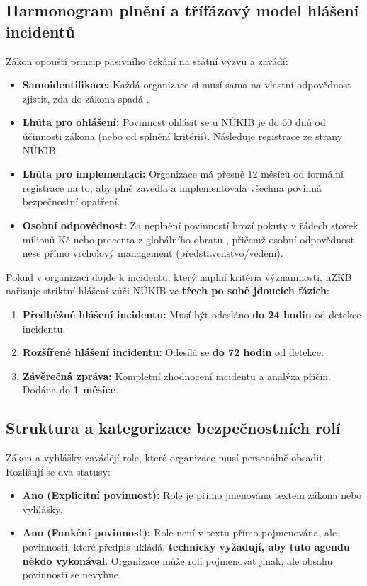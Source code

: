\documentclass[10pt,a4paper]{article}
\begin{document}
	\subsection{Harmonogram plnění a třífázový model hlášení incidentů}
	Zákon opouští princip pasivního čekání na státní výzvu a zavádí:
	\begin{itemize}
		\item \textbf{Samoidentifikace:} Každá organizace si musí sama na vlastní odpovědnost zjistit, zda do zákona spadá .  
		
		\item \textbf{Lhůta pro ohlášení:} Povinnost ohlásit se u NÚKIB je do 60 dnů od účinnosti zákona (nebo od splnění kritérií). Následuje registrace ze strany NÚKIB.  
		
		\item \textbf{Lhůta pro implementaci:} Organizace má přesně 12 měsíců od formální registrace na to, aby plně zavedla a implementovala všechna povinná bezpečnostní opatření.  
		
		\item \textbf{Osobní odpovědnost:} Za neplnění povinností hrozí pokuty v řádech stovek milionů Kč nebo procenta z globálního obratu , přičemž osobní odpovědnost nese přímo vrcholový management (představenstvo/vedení).
	\end{itemize}
	
	Pokud v organizaci dojde k incidentu, který naplní kritéria významnosti, nZKB nařizuje striktní hlášení vůči NÚKIB ve \textbf{třech po sobě jdoucích fázích}:
	
	\begin{enumerate}
		\item \textbf{Předběžné hlášení incidentu:} Musí být odesláno \textbf{do 24 hodin} od detekce incidentu.
		\item \textbf{Rozšířené hlášení incidentu:} Odesílá se \textbf{do 72 hodin} od detekce.
		\item \textbf{Závěrečná zpráva:} Kompletní zhodnocení incidentu a analýza příčin. Dodána do \textbf{1 měsíce}.
	\end{enumerate}
	
	\subsection{Struktura a kategorizace bezpečnostních rolí}
	Zákon a vyhlášky zavádějí role, které organizace musí personálně obsadit. Rozlišují se dva statusy:
	\begin{itemize}
		\item \textbf{Ano (Explicitní povinnost):} Role je přímo jmenována textem zákona nebo vyhlášky.
		\item \textbf{Ano (Funkční povinnost):} Role není v textu přímo pojmenována, ale povinnosti, které předpis ukládá, \textbf{technicky vyžadují, aby tuto agendu někdo vykonával}. Organizace může roli pojmenovat jinak, ale obsahu povinností se nevyhne.
	\end{itemize}
	
\end{document}
